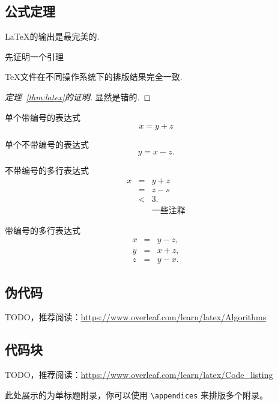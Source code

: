 \documentclass{nktba}
\begin{document}
\subsection{公式定理}

\begin{Theorem} \label{thm:latex}
\LaTeX 的输出是最完美的.
\end{Theorem}

先证明一个引理
\begin{Lemma} \label{thm:tex}
\TeX 文件在不同操作系统下的排版结果完全一致.
\end{Lemma}

\begin{proof}[定理~\ref{thm:latex}的证明]
显然是错的.
\end{proof}

单个带编号的表达式
\begin{equation}\label{eq:a1}
x=y+z
\end{equation}

单个不带编号的表达式
\[
y=x-z.
\]

不带编号的多行表达式
\begin{eqnarray*}
x&=&y+z \\
  &=&z-s\\
  &<& 3. \\
  && \mbox{一些注释}
\end{eqnarray*}

带编号的多行表达式
\begin{eqnarray}
  x&=& y-z, \label{eq:aa1}\\
  y&=& x+z, \nonumber \\
  z&=&y-x. \label{eq:aa2}
\end{eqnarray}

\subsection{伪代码}

TODO，推荐阅读：\url{https://www.overleaf.com/learn/latex/Algorithms}

\subsection{代码块}

TODO，推荐阅读：\url{https://www.overleaf.com/learn/latex/Code_listing}

\appendix
此处展示的为单标题附录，你可以使用 \verb|\appendices| 来排版多个附录。

\begin{reference}
\printbibliography[heading=none]
\end{reference}

\begin{acknowledgement}

\end{acknowledgement}
\end{document}
